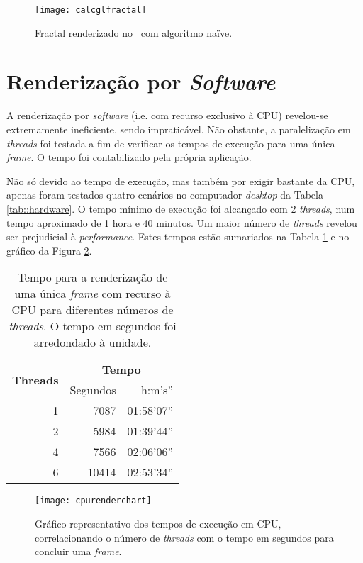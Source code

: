 \begin{figure}[!hbp]
	\centering
	\texttt{[image: calcglfractal]}
	\caption[Fractal no \theapp~com algoritmo naïve]{Fractal renderizado no \theapp~com algoritmo naïve.}
	\label{fig::calcglfractal}
\end{figure}



\section{Renderização por \textit{Software}}
\label{sec::testes:software}

A renderização por \textit{software} (i.e. com recurso exclusivo à \ac{CPU}) revelou-se extremamente ineficiente, sendo impraticável. Não obstante, a paralelização em \textit{threads} foi testada a fim de verificar os tempos de execução para uma única \textit{frame}. O tempo foi contabilizado pela própria aplicação.

Não só devido ao tempo de execução, mas também por exigir bastante da \ac{CPU}, apenas foram testados quatro cenários no computador \textit{desktop} da Tabela \ref{tab::hardware}. O tempo mínimo de execução foi alcançado com 2 \textit{threads}, num tempo aproximado de 1 hora e 40 minutos. Um maior número de \textit{threads} revelou ser prejudicial à \textit{performance}. Estes tempos estão sumariados na Tabela \ref{tab::render_cpu} e no gráfico da Figura \ref{fig::cpurenderchart}.

\begin{table}[!hbtp]
	\centering
	\caption[Tempos de renderização em \acs{CPU}]{Tempo para a renderização de uma única \textit{frame} com recurso à \acs{CPU} para diferentes números de \textit{threads}. O tempo em segundos foi arredondado à unidade.}
	\label{tab::render_cpu}
	\begin{tabular}{r r r}
		\toprule
		\multirow{2}{*}{\textbf{Threads}} & \multicolumn{2}{c}{\textbf{Tempo}} \\
		\cline{2-3}
		& Segundos & h:m's'' \\
		\midrule
		1 &  7087 & 01:58'07'' \\
		2 &  5984 & 01:39'44'' \\
		4 &  7566 & 02:06'06'' \\
		6 & 10414 & 02:53'34'' \\
		\bottomrule
	\end{tabular}
\end{table}

\begin{figure}[!hbtp]
	\centering
	\texttt{[image: cpurenderchart]}
	\caption[Gráfico dos tempos de execução em \acs{CPU}]{Gráfico representativo dos tempos de execução em \acs{CPU}, correlacionando o número de \textit{threads} com o tempo em segundos para concluir uma \textit{frame}.}
	\label{fig::cpurenderchart}
\end{figure}

